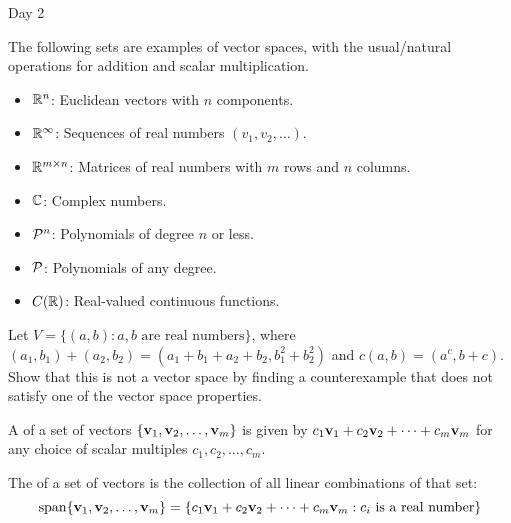 
\begin{applicationActivities}{Day 2}

\begin{remark}
  The following sets are examples of vector spaces, with the usual/natural
  operations for addition and scalar multiplication.
  \begin{itemize}
    \item \(\IR^n\): Euclidean vectors with \(n\) components.
    \item \(\IR^\infty\): Sequences of real numbers \((v_1,v_2,\dots)\).
    \item \(\IR^{m\times n}\): Matrices of real numbers with \(m\) rows and
          \(n\) columns.
    \item \(\IC\): Complex numbers.
    \item \(\P^n\): Polynomials of degree \(n\) or less.
    \item \(\P\): Polynomials of any degree.
    \item \(C(\IR)\): Real-valued continuous functions.
  \end{itemize}
\end{remark}

\begin{activity}{15}
  Let \(V=\{(a,b):a,b\text{ are real numbers}\}\), where \((a_1,b_1)+(a_2,b_2)=
  (a_1+b_1+a_2+b_2,b_1^2+b_2^2)\) and \(c(a,b)=(a^c,b+c)\). Show that
  this is not a vector space by finding a counterexample
  that does not satisfy one of the vector space properties.

  \vectorSpaceProperties
\end{activity}

\begin{definition}
  A  of a set of vectors
  \(\{\vect v_1,\vect v_2,\dots,\vect v_m\}\) is given by
  \(c_1\vect v_1+c_2\vect v_2+\dots+c_m\vect v_m\) for any choice of
  scalar multiples \(c_1,c_2,\dots,c_m\).
\end{definition}

\begin{definition}
  The  of a set of vectors is the collection of all linear
  combinations of that set:
  \[
    \vspan\{\vect v_1,\vect v_2,\dots,\vect v_m\} =
    \{c_1\vect v_1+c_2\vect v_2+\dots+c_m\vect v_m :
    c_i\text{ is a real number}\}
  \]
\end{definition}


\end{applicationActivities}

